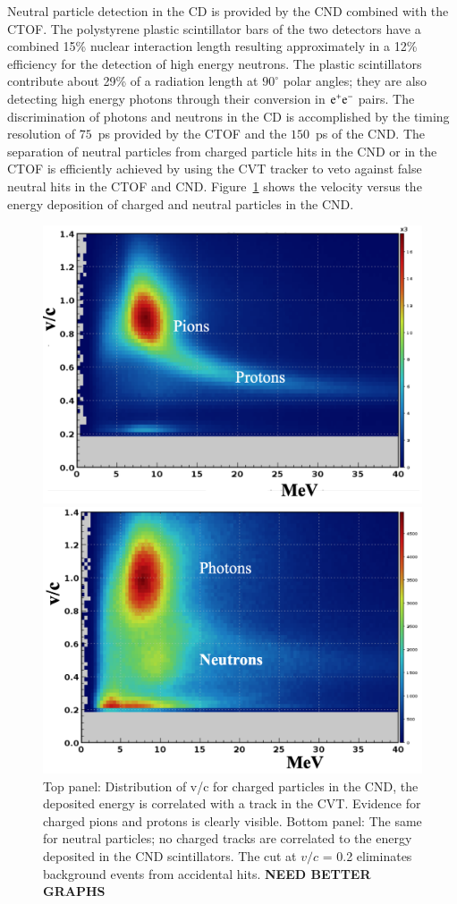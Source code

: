 \documentclass[final,3p,twocolumn]{elsarticle}
\begin{document}
Neutral particle detection in the CD is provided by the CND combined with the CTOF. The polystyrene plastic scintillator
bars of the two detectors have a combined 15\% nuclear interaction length resulting approximately in a 12\% efficiency
for the detection of high energy neutrons. The plastic scintillators contribute about 29\% of a radiation length at
$90^\circ$ polar angles; they are also detecting high energy photons through their conversion in $\rm e^+e^-$ pairs. The
discrimination of photons and neutrons in the CD is  accomplished by the timing resolution of $75$~ps provided by the
CTOF and the $150$~ps of the CND. The separation of neutral particles from charged particle hits in the CND or in the
CTOF is efficiently achieved by using the CVT tracker to veto against false neutral hits in the CTOF and CND.
Figure~\ref{CND-neutrals} shows the velocity versus the energy deposition of charged and neutral particles in the CND.  

\begin{figure}[htbp!]
\centerline{\includegraphics[width=0.9\columnwidth]{CND1.png}}
\centerline{\includegraphics[width=0.9\columnwidth]{CND2.png}}
\caption{Top panel: Distribution of v/c for charged particles in the CND, the deposited energy is correlated with a
track in the CVT. Evidence for charged pions and protons is clearly visible.  Bottom panel: The same for neutral
particles; no charged tracks are correlated to the energy deposited in the CND scintillators. The cut at $v/c$ = 0.2
eliminates background events from accidental hits. {\bf NEED BETTER GRAPHS}} 
\label{CND-neutrals}
\end{figure} 
\end{document}
